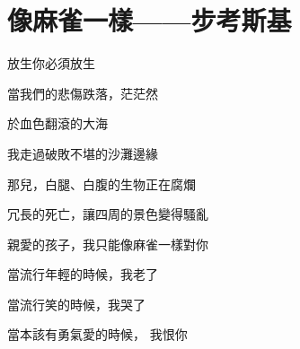 \section{像麻雀一樣——步考斯基}
放生你必須放生

當我們的悲傷跌落，茫茫然

於血色翻滾的大海

我走過破敗不堪的沙灘邊緣

那兒，白腿、白腹的生物正在腐爛

冗長的死亡，讓四周的景色變得騷亂

親愛的孩子，我只能像麻雀一樣對你

當流行年輕的時候，我老了

當流行笑的時候，我哭了

當本該有勇氣愛的時候， 我恨你
